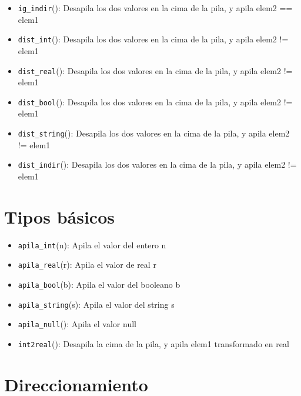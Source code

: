 \begin{itemize}
    \item \texttt{ig\_indir}(): Desapila los dos valores en la cima de la pila, y apila elem2 == elem1
    \item \texttt{dist\_int}(): Desapila los dos valores en la cima de la pila, y apila elem2 != elem1
    \item \texttt{dist\_real}(): Desapila los dos valores en la cima de la pila, y apila elem2 != elem1
    \item \texttt{dist\_bool}(): Desapila los dos valores en la cima de la pila, y apila elem2 != elem1
    \item \texttt{dist\_string}(): Desapila los dos valores en la cima de la pila, y apila elem2 != elem1
    \item \texttt{dist\_indir}(): Desapila los dos valores en la cima de la pila, y apila elem2 != elem1
\end{itemize}

\section{Tipos básicos}

\begin{itemize}
    \item \texttt{apila\_int}(n): Apila el valor del entero n
    \item \texttt{apila\_real}(r): Apila el valor de real r
    \item \texttt{apila\_bool}(b): Apila el valor del booleano b
    \item \texttt{apila\_string}(s): Apila el valor del string s
    \item \texttt{apila\_null}(): Apila el valor null
    \item \texttt{int2real}(): Desapila la cima de la pila, y apila elem1 transformado en real
\end{itemize}

\section{Direccionamiento}

